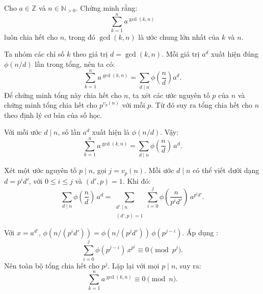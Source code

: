 \documentclass[../05-modular-arithmetic-a.tex]{subfiles}
\begin{document}
\begin{example*}
    Cho \( a \in \mathbb{Z} \) và \( n \in \mathbb{N}_{>0} \). Chứng minh rằng:
    \[
        \sum_{k=1}^{n} a^{\gcd(k,n)}
    \]
    luôn chia hết cho \( n \), trong đó \( \gcd(k,n) \) là ước chung lớn nhất của \( k \) và \( n \).
\end{example*}

\begin{story*}
    Ta nhóm các chỉ số \( k \) theo giá trị \( d = \gcd(k, n) \). Mỗi giá trị \( a^d \) xuất hiện đúng \(\phi(n/d)\) lần trong tổng, nên ta có:
    \[
        \sum_{k=1}^{n} a^{\gcd(k,n)} = \sum_{d \mid n} \phi\left(\frac{n}{d}\right) a^d.
    \]
    Để chứng minh tổng này chia hết cho \(n\), ta xét các ước nguyên tố \(p\) của \(n\) và chứng minh tổng chia hết cho \(p^{v_p(n)}\) với mỗi \(p\). Từ đó suy ra tổng chia hết cho \(n\) theo định lý cơ bản của số học.
\end{story*}

\bigbreak

\begin{soln}
    Với mỗi ước \( d \mid n \), số lần \( a^d \) xuất hiện là \( \phi(n/d) \). Vậy:
    \[
        \sum_{k=1}^n a^{\gcd(k,n)} = \sum_{d \mid n} \phi\left( \frac{n}{d} \right)\, a^d.
    \]

    Xét một ước nguyên tố \( p \mid n \), gọi \( j = v_p(n) \).
    Mỗi ước \( d \mid n \) có thể viết dưới dạng \( d = p^i d' \), với \( 0 \le i \le j \) và \( (d', p) = 1 \). Khi đó:
    \[
        \sum_{d \mid n} \phi\left(\frac{n}{d}\right)\, a^d
        = \sum_{\substack{d' \mid n \\ (d',p)=1}} \sum_{i=0}^j \phi\left( \frac{n}{p^i d'} \right)\, a^{p^i d'}.
    \]

    Với \( x = a^{d'} \), \( \phi(n/(p^i d')) = \phi(n/(p^j d'))\, \phi(p^{j - i}) \). Áp dụng :
    \[
        \sum_{i = 0}^j \phi(p^{j - i})\, x^{p^i} \equiv 0 \pmod{p^j}.
    \]
    Nên toàn bộ tổng chia hết cho \( p^j \). Lặp lại với mọi \( p \mid n \), suy ra:
    \[
        \sum_{k=1}^n a^{\gcd(k,n)} \equiv 0 \pmod{n}.
    \]
\end{soln}
\end{document}
